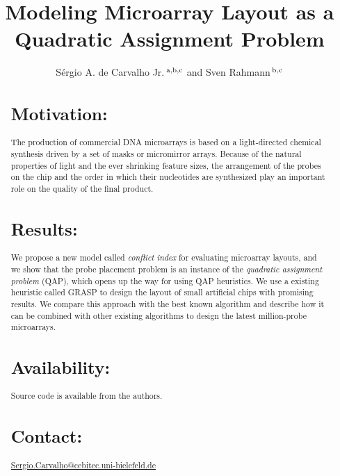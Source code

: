 \documentclass{bioinfo}
\begin{document}

\title[Modeling Microarray Layout as a Quadratic Assignment
Problem]{Modeling Microarray Layout as a Quadratic Assignment Problem}

\author[de Carvalho Jr. and Rahmann]{S\'ergio A. de Carvalho Jr.\,$^{\rm a,b,c}$ and Sven Rahmann\,$^{\rm b,c}$}
\address{$^{\rm a}$Graduiertenkolleg Bioinformatik, Bielefeld University, Germany,\\
  $^{\rm b}$International NRW Graduate School in Bioinformatics and Genome Research, Bielefeld University, Germany,\\
  $^{\rm c}$Algorithms and Statistics for Systems Biology group, Genome Informatics, Technische Fakult\"at, Bielefeld University, D-33594 Bielefeld, Germany.
}
\maketitle

\begin{abstract}
\section{Motivation:}
The production of commercial DNA microarrays is based on a
light-directed chemical synthesis driven by a set of masks or
micromirror arrays. Because of the natural properties of light and the
ever shrinking feature sizes, the arrangement of the probes on the
chip and the order in which their nucleotides are synthesized play an
important role on the quality of the final product.
\section{Results:}
We propose a new model called \emph{conflict index} for evaluating
microarray layouts, and we show that the probe placement problem is an
instance of the \emph{quadratic assignment problem} (QAP), which opens
up the way for using QAP heuristics. We use a existing heuristic
called GRASP to design the layout of small artificial chips with
promising results. We compare this approach with the best known
algorithm and describe how it can be combined with other existing
algorithms to design the latest million-probe microarrays.
\section{Availability:}
Source code is available from the authors.
\section{Contact:} \href{Sergio.Carvalho@cebitec.uni-bielefeld.de}{Sergio.Carvalho@cebitec.uni-bielefeld.de}
\end{abstract}
\end{document}
